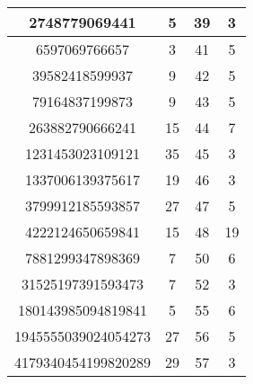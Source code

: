 \begin{table}[!htbp]
\begin{tabular}{|c|c|c|c|}
2748779069441       & 5   & 39 & 3     \\ \hline
6597069766657       & 3   & 41 & 5     \\ \hline
39582418599937      & 9   & 42 & 5     \\ \hline
79164837199873      & 9   & 43 & 5     \\ \hline
263882790666241     & 15  & 44 & 7     \\ \hline
1231453023109121    & 35  & 45 & 3     \\ \hline
1337006139375617    & 19  & 46 & 3     \\ \hline
3799912185593857    & 27  & 47 & 5     \\ \hline
4222124650659841    & 15  & 48 & 19    \\ \hline
7881299347898369    & 7   & 50 & 6     \\ \hline
31525197391593473   & 7   & 52 & 3     \\ \hline
180143985094819841  & 5   & 55 & 6     \\ \hline
1945555039024054273 & 27  & 56 & 5     \\ \hline
4179340454199820289 & 29  & 57 & 3     \\ \hline
\end{tabular}
\end{table}